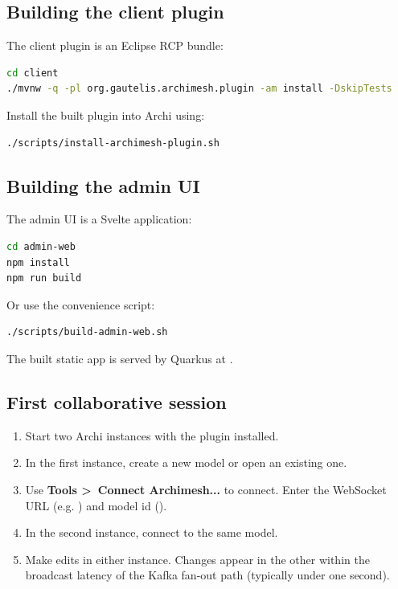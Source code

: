 \subsection{Building the client plugin}

The client plugin is an Eclipse RCP bundle:

\begin{lstlisting}[language=bash,caption={Build client plugin}]
cd client
./mvnw -q -pl org.gautelis.archimesh.plugin -am install -DskipTests
\end{lstlisting}

Install the built plugin into Archi using:

\begin{lstlisting}[language=bash,caption={Install plugin}]
./scripts/install-archimesh-plugin.sh
\end{lstlisting}

\subsection{Building the admin UI}

The admin UI is a Svelte application:

\begin{lstlisting}[language=bash,caption={Build admin UI}]
cd admin-web
npm install
npm run build
\end{lstlisting}

Or use the convenience script:

\begin{lstlisting}[language=bash,caption={Build admin UI via script}]
./scripts/build-admin-web.sh
\end{lstlisting}

The built static app is served by Quarkus at .

\subsection{First collaborative session}

\begin{enumerate}
\item Start two Archi instances with the plugin installed.
\item In the first instance, create a new model or open an existing one.
\item Use \textbf{Tools \textgreater\ Connect Archimesh...} to connect.
  Enter the WebSocket URL (e.g. ) and model id
  ().
\item In the second instance, connect to the same model.
\item Make edits in either instance. Changes appear in the other within the
  broadcast latency of the Kafka fan-out path (typically under one second).
\end{enumerate}

